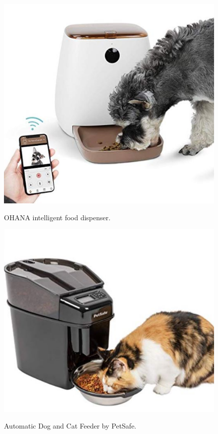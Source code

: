 \documentclass[twocolumn]{webofc}
\begin{document}
\begin{figure}
  \centering
  \includegraphics[width=\columnwidth]{OHANA.JPG}
  \caption{OHANA intelligent food dispenser.}\label{fig:ohana}\cite{ohana}
\end{figure}
\begin{figure}
  \centering
  \includegraphics[width=\columnwidth]{petsafe.JPG}
  \caption{Automatic Dog and Cat Feeder by PetSafe.}\label{fig:petsafe}\cite{petsafe}
\end{figure}
\end{document}
